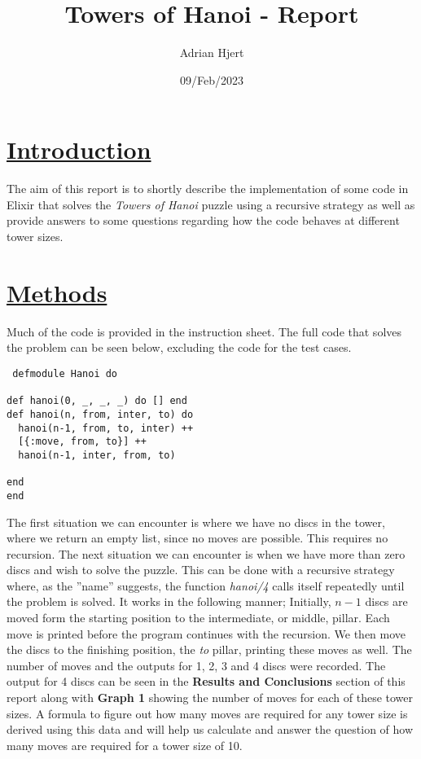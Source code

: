 \documentclass[a4paper,11pt]{article}
\begin{document}
\title{
	\textbf{Towers of Hanoi - Report}
	}
\author{Adrian Hjert}
\date{09/Feb/2023}

\maketitle

\section*{
	\underline{Introduction}
}
The aim of this report is to shortly describe the implementation of some code in Elixir that solves the \textit{Towers of Hanoi} puzzle using a recursive strategy as well as provide answers to some questions regarding how the code behaves at different tower sizes.

\section*{
	\underline{Methods}
}
Much of the code is provided in the instruction sheet. The full code that solves the problem can be seen below, excluding the code for the test cases.

\begin{verbatim}
 defmodule Hanoi do
 
def hanoi(0, _, _, _) do [] end
def hanoi(n, from, inter, to) do
  hanoi(n-1, from, to, inter) ++
  [{:move, from, to}] ++
  hanoi(n-1, inter, from, to)

end
end
\end{verbatim}

The first situation we can encounter is where we have no discs in the tower, where we return an empty list, since no moves are possible. This requires no recursion. The next situation we can encounter is when we have more than zero discs and wish to solve the puzzle. This can be done with a recursive strategy where, as the ''name'' suggests, the function \textit{hanoi/4} calls itself repeatedly until the problem is solved. It works in the following manner;
Initially, $n - 1$ discs are moved form the starting position to the intermediate, or middle, pillar. Each move is printed before the program continues with the recursion. We then move the discs to the finishing position, the \textit{to} pillar, printing these moves as well. The number of moves and the outputs for 1, 2, 3 and 4 discs were recorded. The output for 4 discs can be seen in the \textbf{Results and Conclusions} section of this report along with \textbf{Graph 1} showing the number of moves for each of these tower sizes. A formula to figure out how many moves are required for any tower size is derived using this data and will help us calculate and answer the question of how many moves are required for a tower size of 10.
\end{document}
